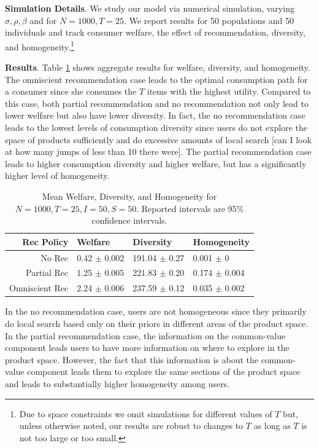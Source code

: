 \documentclass[sigconf]{acmart}
\begin{document}
\par
\noindent \textbf{Simulation Details}. We study our model via numerical simulation, varying $\sigma, \rho, \beta$ and for $N = 1000, T = 25$. We report results for 50 populations and 50 individuals and track consumer welfare, the effect of recommendation, diversity, and homogeneity.\footnote{Due to space constraints we omit simulations for different values of $T$ but, unless otherwise noted, our results are robust to changes to $T$ as long as $T$ is not too large or too small.}
\par
\noindent \textbf{Results}. Table \ref{table:agg_results} shows aggregate results for welfare, diversity, and homogeneity. The omniscient recommendation case leads to the optimal consumption path for a consumer since she consumes the $T$ items with the highest utility. Compared to this case, both partial recommendation and no recommendation not only lead to lower welfare but also have lower diversity. In fact, the no recommendation case leads to the lowest levels of consumption diversity since users do not explore the space of products sufficiently and do excessive amounts of local search [can I look at how many jumps of less than 10 there were]. The partial recommendation case leads to higher consumption diversity and higher welfare, but has a significantly higher level of homogeneity.

\begin{table}[ht]
\centering
\begin{tabular}{rlll}
  \hline
Rec Policy & Welfare & Diversity & Homogeneity \\ 
  \hline
No Rec & 0.42 $\pm$ 0.002 & 191.04 $\pm$ 0.27 & 0.001 $\pm$ 0 \\ 
Partial Rec & 1.25 $\pm$ 0.005 & 221.83 $\pm$ 0.20 & 0.174 $\pm$ 0.004 \\ 
Omniscient Rec & 2.24 $\pm$ 0.006 & 237.59 $\pm$ 0.12 & 0.035 $\pm$ 0.002 \\ 
   \hline
\end{tabular}
\caption{Mean Welfare, Diversity, and Homogeneity for $N = 1000, T = 25, I = 50, S = 50$. Reported intervals are 95\% confidence intervals.}
\label{table:agg_results}
\end{table}

In the no recommendation case, users are not homogeneous since they primarily do local search based only on their priors in different areas of the product space. In the partial recommendation case, the information on the common-value component leads users to have more information on where to explore in the product space. However, the fact that this information is about the common-value component leads them to explore the same sections of the product space and leads to substantially higher homogeneity among users.
\end{document}
